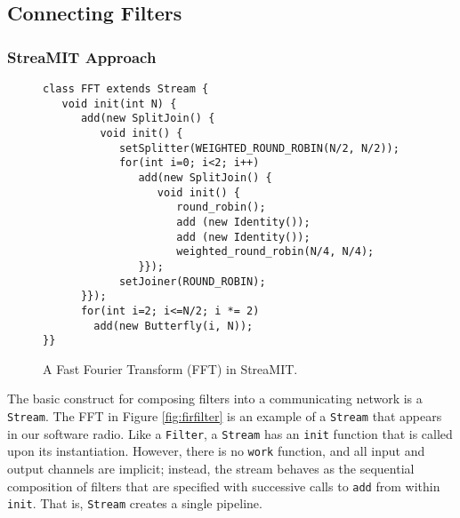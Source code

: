 \subsection{Connecting Filters}

\subsubsection{StreaMIT Approach}

\begin{figure}
\scriptsize
\begin{verbatim}
class FFT extends Stream {
   void init(int N) {
      add(new SplitJoin() {
         void init() {
            setSplitter(WEIGHTED_ROUND_ROBIN(N/2, N/2));
            for(int i=0; i<2; i++) 
               add(new SplitJoin() {
                  void init() {
                     round_robin();
                     add (new Identity());
                     add (new Identity());
                     weighted_round_robin(N/4, N/4);
               }});
            setJoiner(ROUND_ROBIN);
      }});
      for(int i=2; i<=N/2; i *= 2)
        add(new Butterfly(i, N));
}}
\end{verbatim}
\vspace{-12pt}
\caption{\protect\small A Fast Fourier Transform (FFT) in StreaMIT.
\protect\label{fig:fft}}
\vspace{-12pt}
\end{figure}

The basic construct for composing filters into a communicating network
is a {\tt Stream}.  The FFT in Figure \ref{fig:firfilter} is an
example of a {\tt Stream} that appears in our software radio.  Like a
{\tt Filter}, a {\tt Stream} has an {\tt init} function that is called
upon its instantiation.  However, there is no {\tt work} function, and
all input and output channels are implicit; instead, the stream
behaves as the sequential composition of filters that are specified
with successive calls to {\tt add} from within {\tt init}.  That is,
{\tt Stream} creates a single pipeline.

